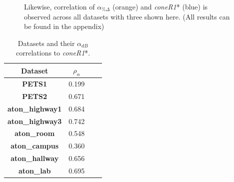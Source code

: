 \begin{figure}
\caption{Likewise, correlation of $\alpha_{\%\Delta}$ (orange) and \textit{coneR1}* (blue) is observed across all datasets with three shown here. (All results can be found in the appendix)}
\label{fig:corr_rgb}
\end{figure}

\begin{table}
\centering
\caption{Datasets and their $\alpha_{dB}$ correlations to \textit{coneR1}*.}
\begin{tabular}{ |c|c|c|c| }
	\hline
	\textbf{Dataset} & \textbf{$\rho_{\alpha}$} \\
	\hline
	\hline
	\textbf{PETS1} & 0.199 \\
	\hline
	\textbf{PETS2} & 0.671 \\
	\hline
	\textbf{aton\_highway1} & 0.684 \\
	\hline
	\textbf{aton\_highway3} & 0.742 \\
	\hline
	\textbf{aton\_room} & 0.548 \\
	\hline
	\textbf{aton\_campus} & 0.360 \\
	\hline
	\textbf{aton\_hallway} & 0.656 \\
	\hline
	\textbf{aton\_lab} &  0.695 \\
	\hline
\end{tabular}

\label{table:corr_db}
\end{table}

